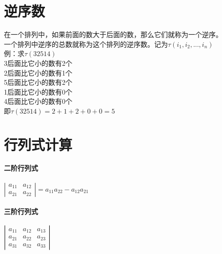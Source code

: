 \documentclass{article}
\begin{document}
\begin{flushleft}
	\LARGE
	
	\newcommand{\udots}{\mathinner{\mskip1mu\raise1pt\vbox{\kern7pt\hbox{.}}  
			\mskip2mu\raise4pt\hbox{.}\mskip2mu\raise7pt\hbox{.}\mskip1mu}} 


	\section{逆序数}
	在一个排列中，如果前面的数大于后面的数，那么它们就称为一个逆序。\\
	一个排列中逆序的总数就称为这个排列的逆序数。记为$\tau(i_1,i_2,...,i_n)$\\
	例：求$\tau(32514)$\\
	\qquad 3后面比它小的数有2个\\
	\qquad 2后面比它小的数有1个\\
	\qquad 5后面比它小的数有2个\\
	\qquad 1后面比它小的数有0个\\
	\qquad 4后面比它小的数有0个\\
	\qquad 即$\tau(32514)=2+1+2+0+0=5$\\
	
	\section{行列式计算}
	\paragraph{二阶行列式}
	$\left|\begin{array}{cccc} 
		a_{11}&a_{12}\\ 
		a_{21}&a_{22}
	\end{array}\right|=a_{11}a_{22}-a_{12}a_{21}$\\

	\paragraph{三阶行列式}
	$\left|\begin{array}{cccc} 
		a_{11}&a_{12}&a_{13}\\ 
		a_{21}&a_{22}&a_{23}\\
		a_{31}&a_{32}&a_{33}
	\end{array}\right|$\\

	
	

\end{flushleft}
\end{document}
